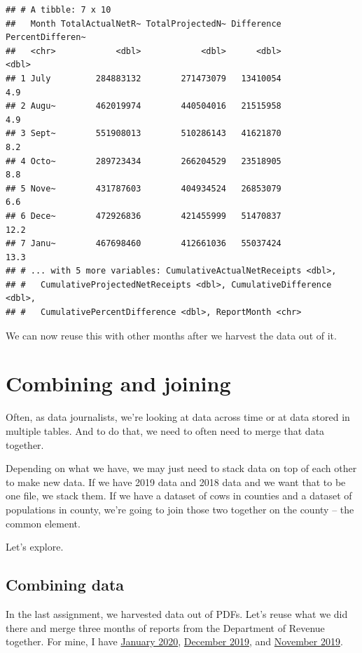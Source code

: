 \documentclass[]{book}
\begin{document}
\begin{verbatim}
## # A tibble: 7 x 10
##   Month TotalActualNetR~ TotalProjectedN~ Difference PercentDifferen~
##   <chr>            <dbl>            <dbl>      <dbl>            <dbl>
## 1 July         284883132        271473079   13410054              4.9
## 2 Augu~        462019974        440504016   21515958              4.9
## 3 Sept~        551908013        510286143   41621870              8.2
## 4 Octo~        289723434        266204529   23518905              8.8
## 5 Nove~        431787603        404934524   26853079              6.6
## 6 Dece~        472926836        421455999   51470837             12.2
## 7 Janu~        467698460        412661036   55037424             13.3
## # ... with 5 more variables: CumulativeActualNetReceipts <dbl>,
## #   CumulativeProjectedNetReceipts <dbl>, CumulativeDifference <dbl>,
## #   CumulativePercentDifference <dbl>, ReportMonth <chr>
\end{verbatim}

We can now reuse this with other months after we harvest the data out of it.

\hypertarget{combining-and-joining}{%
\chapter{Combining and joining}\label{combining-and-joining}}

Often, as data journalists, we're looking at data across time or at data stored in multiple tables. And to do that, we need to often need to merge that data together.

Depending on what we have, we may just need to stack data on top of each other to make new data. If we have 2019 data and 2018 data and we want that to be one file, we stack them. If we have a dataset of cows in counties and a dataset of populations in county, we're going to join those two together on the county -- the common element.

Let's explore.

\hypertarget{combining-data}{%
\section{Combining data}\label{combining-data}}

In the last assignment, we harvested data out of PDFs. Let's reuse what we did there and merge three months of reports from the Department of Revenue together. For mine, I have \href{https://unl.box.com/s/nd1yaroltsy161pqgbges9xrtav2qdqp}{January 2020}, \href{https://unl.box.com/s/jfdtqffty1vb2zbil8z5qalu18yg0590}{December 2019}, and \href{https://unl.box.com/s/g1dc0mibxxutsitqssv2uf75pmb7avle}{November 2019}.
\end{document}
